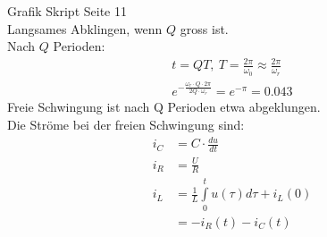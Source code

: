 Grafik Skript Seite 11\\
Langsames Abklingen, wenn $Q$ gross ist.\\
Nach $Q$ Perioden:
\begin{align}
t=QT,\ T=\frac{2\pi}{\omega_0}\approx\frac{2\pi}{\omega_r}\nonumber\\
e^{-\frac{\omega_r\cdot Q \cdot 2\pi}{2Q\cdot \omega_r}}=e^{-\pi} = 0.043
\nonumber
\end{align}
Freie Schwingung ist nach Q Perioden etwa abgeklungen.\\
Die Ströme bei der freien Schwingung sind:\\
\begin{align}
	i_C&=C\cdot\frac{du}{dt}\\
	i_R&=\frac{U}{R}\\
	i_L&=\frac{1}{L}\int\limits_0^t{u(\tau)d\tau+i_L(0)}\\
	&=-i_R(t)-i_C(t)
\end{align}\\